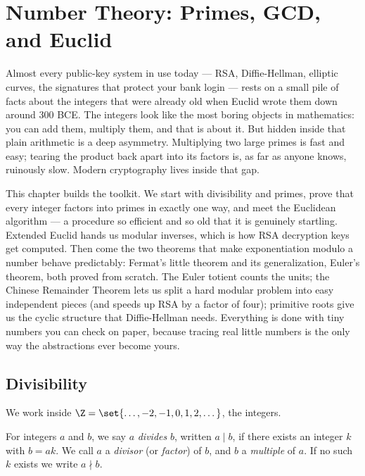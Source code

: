 \chapter{Number Theory: Primes, GCD, and Euclid}

Almost every public-key system in use today --- RSA, Diffie-Hellman, elliptic curves, the
signatures that protect your bank login --- rests on a small pile of facts about the integers
that were already old when Euclid wrote them down around 300 BCE. The integers look like the
most boring objects in mathematics: you can add them, multiply them, and that is about it. But
hidden inside that plain arithmetic is a deep asymmetry. Multiplying two large primes is fast and
easy; tearing the product back apart into its factors is, as far as anyone knows, ruinously slow.
Modern cryptography lives inside that gap.

This chapter builds the toolkit. We start with divisibility and primes, prove that every integer
factors into primes in exactly one way, and meet the Euclidean algorithm --- a procedure so
efficient and so old that it is genuinely startling. Extended Euclid hands us modular inverses,
which is how RSA decryption keys get computed. Then come the two theorems that make exponentiation
modulo a number behave predictably: Fermat's little theorem and its generalization, Euler's
theorem, both proved from scratch. The Euler totient counts the units; the Chinese Remainder
Theorem lets us split a hard modular problem into easy independent pieces (and speeds up RSA by a
factor of four); primitive roots give us the cyclic structure that Diffie-Hellman needs. Everything
is done with tiny numbers you can check on paper, because tracing real little numbers is the only
way the abstractions ever become yours.

\chapterline

\section{Divisibility}
\label{ch04:divisibility}

We work inside $\Z = \set{\dots, -2, -1, 0, 1, 2, \dots}$, the integers.

\begin{definition}[Divisibility]
\label{ch04:def-divides}
For integers $a$ and $b$, we say $a$ \emph{divides} $b$, written $a \mid b$, if there exists an
integer $k$ with $b = ak$. We call $a$ a \emph{divisor} (or \emph{factor}) of $b$, and $b$ a
\emph{multiple} of $a$. If no such $k$ exists we write $a \nmid b$.
\end{definition}


